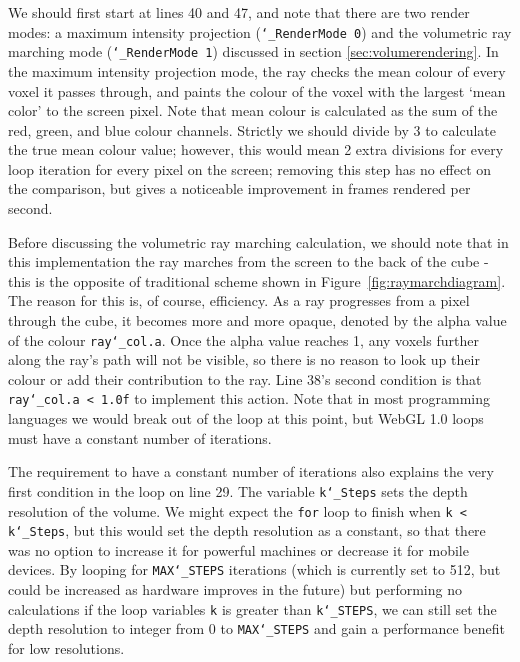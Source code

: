 We should first start at lines 40 and 47, and note that there are two render modes: a maximum intensity projection (\texttt{\char`_RenderMode 0}) and the volumetric ray marching mode (\texttt{\char`_RenderMode 1}) discussed in section \ref{sec:volumerendering}.
In the maximum intensity projection mode, the ray checks the mean colour of every voxel it passes through, and paints the colour of the voxel with the largest `mean color' to the screen pixel.
Note that mean colour is calculated as the sum of the red, green, and blue colour channels.
Strictly we should divide by $3$ to calculate the true mean colour value; however, this would mean 2 extra divisions for every loop iteration for every pixel on the screen; removing this step has no effect on the comparison, but gives a noticeable improvement in frames rendered per second. %

Before discussing the volumetric ray marching calculation, we should note that in this implementation the ray marches from the screen to the back of the cube - this is the opposite of traditional scheme shown in Figure~\ref{fig:raymarchdiagram}.
The reason for this is, of course, efficiency.
As a ray progresses from a pixel through the cube, it becomes more and more opaque, denoted by the alpha value of the colour \texttt{ray\char`_col.a}.
Once the alpha value reaches 1, any voxels further along the ray's path will not be visible, so there is no reason to look up their colour or add their contribution to the ray.
Line 38's second condition is that \texttt{ray\char`_col.a < 1.0f} to implement this action.
Note that in most programming languages we would break out of the loop at this point, but WebGL 1.0 loops must have a constant number of iterations.

The requirement to have a constant number of iterations also explains the very first condition in the loop on line 29.
The variable \texttt{k\char`_Steps} sets the depth resolution of the volume.
We might expect the \texttt{for} loop to finish when \texttt{k < k\char`_Steps}, but this would set the depth resolution as a constant, so that there was no option to increase it for powerful machines or decrease it for mobile devices.
By looping for \texttt{MAX\char`_STEPS} iterations (which is currently set to 512, but could be increased as hardware improves in the future) but performing no calculations if the loop variables \texttt{k} is greater than \texttt{k\char`_STEPS}, we can still set the depth resolution to integer from 0 to \texttt{MAX\char`_STEPS} and gain a performance benefit for low resolutions.

